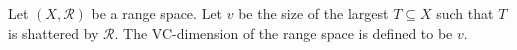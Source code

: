 \begin{definition}[VC-dimension]
	Let \((X, \mathcal{R})\) be a range space.
	Let \(v\) be the size of the largest \(T \subseteq X\) such that
	\(T\) is shattered by \(\mathcal{R}\).
	The VC-dimension of the range space is defined to be \(v\).
\end{definition}
